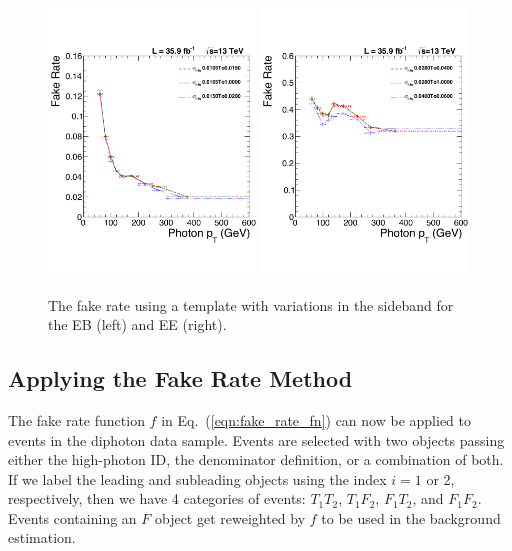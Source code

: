 \begin{figure}[!htbp]
  \centering
  \includegraphics[width=0.49\textwidth]{figures/chIsoFRCompEB.pdf}
  \includegraphics[width=0.49\textwidth]{figures/chIsoFRCompEE.pdf}
  \caption{The fake rate using a \chiso template with variations in the \sieie sideband for the EB (left) and EE (right).}
  \label{fig:fr_chiso_sideband_variation}
\end{figure}


\subsection{Applying the Fake Rate Method}

The fake rate function $f$ in Eq.~(\ref{eqn:fake_rate_fn}) can now be applied to events in the diphoton data sample. Events are selected with two objects passing either the high-\pt photon ID, the denominator definition, or a combination of both.  If we label the leading and subleading objects using the index $i=1$ or 2, respectively, then we have 4 categories of events: $T_1T_2$, $T_1F_2$, $F_1T_2$, and $F_1F_2$. Events containing an $F$ object get reweighted by $f$ to be used in the background estimation.


